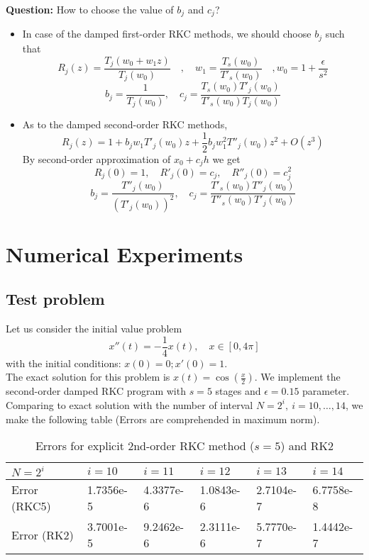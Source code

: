 \documentclass{article}
\theoremstyle{theorem}
\theoremstyle{definition}
\begin{document}
\textbf{Question:} How to choose the value of $b_j$ and $c_j$?\begin{itemize}
	\item In case of the damped first-order RKC methods, we should choose $b_j$ such that  $$R_j(z)=\frac{T_j(w_0+w_1z)}{T_j(w_0)} \quad , \quad w_1=\frac{T_s(w_0)}{T'_s(w_0)} \quad , w_0=1+\frac{\epsilon}{s^2}$$
	$$b_j=\frac{1}{T_j(w_0)} , \quad c_j=\frac{T_s(w_0)T'_j(w_0)}{T'_s(w_0)T_j(w_0)}$$
	\item As to the damped second-order RKC methods,
	$$R_j(z)=1+b_jw_1T'_j(w_0)z+\frac{1}{2}b_jw_1^2T''_j(w_0)z^2 +O(z^3)$$
	By second-order approximation of $x_0+c_jh$ we get $$R_j(0)=1, \quad R'_j(0)=c_j, \quad R''_j(0)=c_j^2$$ 
	$$b_j=\frac{T''_j(w_0)}{(T'_j(w_0))^2} , \quad c_j=\frac{T'_s(w_0)T''_j(w_0)}{T''_s(w_0)T'_j(w_0)}$$
\end{itemize}
	\section{Numerical Experiments}
	\subsection{Test problem}
	Let us consider the initial value problem
	$$x''(t)=-\frac{1}{4}x(t), \quad x \in \left[0,4 \pi\right]$$
	with the initial conditions: $x(0)=0; x'(0)=1$.\\
	The exact solution for this problem is $x(t)=\cos(\frac{x}{2})$. We implement the second-order damped RKC program with $s=5$ stages and $\epsilon = 0.15$ parameter. Comparing to exact solution with the number of interval $N=2^i, \ i=10, \dots , 14$, we make the following table (Errors are comprehended in maximum norm).
	
		\begin{center}
			\begin{table}	
		\begin{tabular}{ | m{1.5cm} | m{1.5cm}|  m{1.5cm}| m{1.5cm}| m{1.5cm}| m{1.5cm}|  }
	\hline
	$N=2^i$ & $i=10$ &  $i=11$ & $i=12$ & $i=13$ &  $i=14$  \\ 
		\hline
		Error (RKC5) & 1.7356e-5  & 4.3377e-6 & 1.0843e-6 & 2.7104e-7 & 6.7758e-8  \\
		\hline
		Error (RK2) &3.7001e-5 &9.2462e-6 &2.3111e-6 &5.7770e-7 & 1.4442e-7 \\
		\hline
	\end{tabular}	

\caption{Errors for explicit 2nd-order RKC method ($s=5$) and RK2 }
\end{table}
	\end{center}
\end{document}
